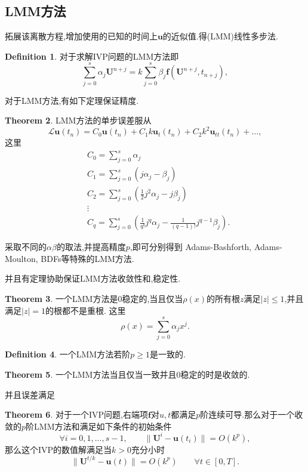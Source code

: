 \documentclass[a4paper]{book}
\numberwithin{equation}{chapter}
\theoremstyle{definition}
\newtheorem{thm}{Theorem}[chapter]
\newtheorem{defn}[thm]{Definition}
\begin{document}
\subsection{LMM方法}

拓展该离散方程,增加使用的已知的时间上$\mathbf{u}$的近似值.得(LMM)线性多步法.

\begin{defn}
	对于求解IVP问题的LMM方法即
	\[\sum_{j=0}^{s} \alpha_j \mathbf{U}^{n+j} = k \sum_{j=0}^{s} \beta_j \mathbf{f} (\mathbf{U}^{n+j}, t_{n+j}),\]
\end{defn}

对于LMM方法,有如下定理保证精度.

\begin{thm}
	LMM方法的单步误差服从
	\[\mathcal{L} \mathbf{u}(t_n) = C_0 \mathbf{u}(t_n) + C_1 k \mathbf{u}_t(t_n) +
	C_2 k ^2 \mathbf{u}_{tt}(t_n) + \dots ,\]
	这里
	\begin{align*}
		&C_0 = \sum_{j=0}^{s} \alpha_j \\
		&C_1 = \sum_{j=0}^{s} (j \alpha_j - \beta_j) \\
		&C_2 = \sum_{j=0}^{s} \left(\frac{1}{2} j^2 \alpha_j - j \beta_j\right) \\
		&\vdots \\
		&C_q = \sum_{j=0}^{s} \left(\frac{1}{q !} j^q \alpha_j - \frac{1}{(q-1) !} j^{q-1} \beta_j \right).
	\end{align*}
\end{thm}

采取不同的$\alpha \beta$的取法,并提高精度$p$,即可分别得到 Adams-Bashforth, Adams-Moulton, BDFs等特殊的LMM方法.

并且有定理协助保证LMM方法收敛性和,稳定性.

\begin{thm}
	一个LMM方法是0稳定的,当且仅当$\rho(x)$的所有根$z$满足$\left|z\right| \leq 1$,并且满足$\left|z\right| = 1$的根都不是重根.
	这里
	\[\rho(x) = \sum_{j=0}^{s} \alpha_j x^j. \]
\end{thm}

\begin{defn}
	一个LMM方法若阶$p \geq 1$是一致的.
\end{defn}

\begin{thm}
	一个LMM方法当且仅当一致并且0稳定的时是收敛的.
\end{thm}

并且误差满足
\begin{thm}
	对于一个IVP问题,右端项$\mathbf{f}$对$u,t$都满足$p$阶连续可导.那么对于一个收敛的$p$阶LMM方法和满足如下条件的初始条件
	\[\forall i = 0, 1, \ldots, s-1, \qquad \lVert \mathbf{U}^i - \mathbf{u}(t_i) \rVert = O(k^p),\]
	那么这个IVP的数值解满足当$k>0$充分小时
	\[\lVert \mathbf{U}^{t/k} - \mathbf{u}(t) \rVert = O(k^p)\qquad \forall t \in [0,T]. \]
\end{thm}
\end{document}
